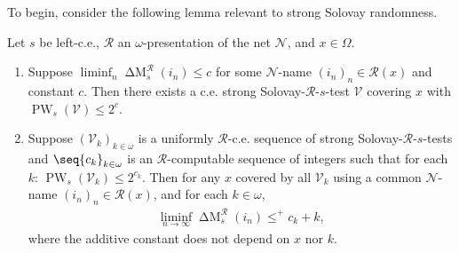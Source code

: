 To begin, consider the following lemma relevant to strong Solovay randomness.

\begin{lemma}
    Let $s$ be left-c.e., $\mathscr{R}$ an $\omega$-presentation of the net $\mathcal{N}$, and $x \in \Omega$. 
    \label{lemma:strong_Solovay_test_vs_bounded_Delta_A}
    \begin{enumerate}[label = (\roman*)]
        \item Suppose $\liminf_n \operatorname{\Delta M}^{\mathscr{R}}_s(i_n) \leq c$ for some $\mathcal{N}$-name $(i_n)_n \in \mathcal{R}(x)$ and constant $c$. Then there exists a c.e. strong Solovay-$\mathscr{R}$-$s$-test $\mathcal{V}$ covering $x$ with $\operatorname{PW}_s(\mathcal{V}) \leq 2^c$.
        \item Suppose $(\mathcal{V}_k)_{k \in \omega}$ is a uniformly $\mathscr{R}$-c.e. sequence of strong Solovay-$\mathscr{R}$-$s$-tests and $\seq{c_k}_{k \in \omega}$ is an $\mathscr{R}
        $-computable sequence of integers such that for each $k$: $\operatorname{PW}_s(\mathcal{V}_k) \leq 2^{c_k}$. Then for any $x$ covered by all $\mathcal{V}_k$ using a common $\mathcal{N}$-name $(i_n)_n \in \mathcal{R}(x)$, and for each $k \in \omega$,
        \begin{align*}
            \liminf_{n \to \infty} \operatorname{\Delta M}^{\mathscr{R}}_s(i_n) \leq^+ c_k + k,
        \end{align*}
        where the additive constant does not depend on $x$ nor $k$.
    \end{enumerate}
\end{lemma}
